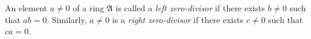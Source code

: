 An element $a \neq 0$ of a ring $\mathfrak{A}$ is called a \emph{left zero-divisor} if there exists $b \neq 0$ such that $ab = 0$. Similarly, $a \neq 0$ is a \emph{right zero-divisor} if there exists $c \neq 0$ such that $ca = 0$.
